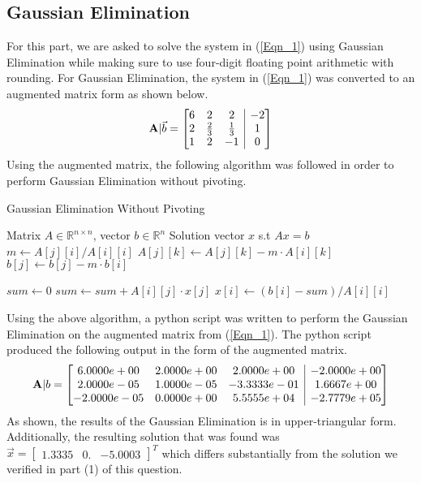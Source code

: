 \documentclass{article}
\begin{document}
\subsection{Gaussian Elimination}
For this part, we are asked to solve the system in (\ref{Eqn_1}) using Gaussian Elimination while making sure to use four-digit floating point arithmetic with rounding. For Gaussian Elimination, the system in (\ref{Eqn_1}) was converted to an augmented matrix form as shown below.
\[
\mathbf{A}|\Vec{b} = 
\left[\begin{array}{@{}ccc|c@{}}
6 & 2 & 2 & -2 \\
2 & \frac{2}{3} & \frac{1}{3} & 1 \\
1 & 2 & -1 & 0
\end{array}\right]
\]
Using the augmented matrix, the following algorithm was followed in order to perform Gaussian Elimination without pivoting.
\begin{algorithm}
\caption{Gaussian Elimination Without Pivoting}
\begin{algorithmic}[1]
\Require Matrix $A \in \mathbb{R}^{n \times n}$, vector $b \in \mathbb{R}^n$
\Ensure Solution vector $x$ s.t $Ax = b$
        \State $m \gets A[j][i] / A[i][i]$
            \State $A[j][k] \gets A[j][k] - m \cdot A[i][k]$
        \EndFor
        \State $b[j] \gets b[j] - m \cdot b[i]$
    \EndFor
\EndFor

\State {}
    \State $sum \gets 0$
        \State $sum \gets sum + A[i][j] \cdot x[j]$
    \EndFor
    \State $x[i] \gets (b[i] - sum) / A[i][i]$
\EndFor
\end{algorithmic}
\end{algorithm}
Using the above algorithm, a python script was written to perform the Gaussian Elimination on the augmented matrix from (\ref{Eqn_1}). The python script produced the following output in the form of the augmented matrix.
\[
\mathbf{A}|b = \left[\begin{array}{@{}ccc|c@{}}
6.0000e+00 & 2.0000e+00 & 2.0000e+00 & -2.0000e+00 \\
2.0000e-05 & 1.0000e-05 & -3.3333e-01 & 1.6667e+00 \\
-2.0000e-05 & 0.0000e+00 & 5.5555e+04 & -2.7779e+05
\end{array}\right]
\]
As shown, the results of the Gaussian Elimination is in upper-triangular form. Additionally, the resulting solution that was found was \(\Vec{x} = \begin{bmatrix}
    1.3335 & 0. & -5.0003
\end{bmatrix}^T\) which differs substantially from the solution we verified in part (1) of this question.
\newpage
\end{document}
